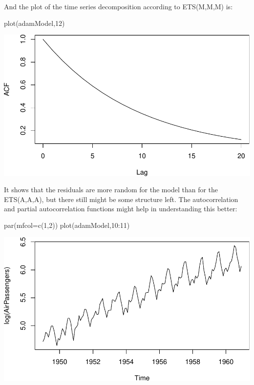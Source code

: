 \documentclass[
]{book}
\newenvironment{Shaded}{\begin{snugshade}}{\end{snugshade}}
\newcommand{\AttributeTok}[1]{\textcolor[rgb]{0.77,0.63,0.00}{#1}}
\newcommand{\DecValTok}[1]{\textcolor[rgb]{0.00,0.00,0.81}{#1}}
\newcommand{\FunctionTok}[1]{\textcolor[rgb]{0.00,0.00,0.00}{#1}}
\newcommand{\NormalTok}[1]{#1}
\newcommand{\SpecialCharTok}[1]{\textcolor[rgb]{0.00,0.00,0.00}{#1}}
\theoremstyle{definition}
\theoremstyle{definition}
\theoremstyle{definition}
\theoremstyle{definition}
\theoremstyle{remark}
\begin{document}
And the plot of the time series decomposition according to ETS(M,M,M) is:

\begin{Shaded}
\begin{Highlighting}[]
\FunctionTok{plot}\NormalTok{(adamModel,}\DecValTok{12}\NormalTok{)}
\end{Highlighting}
\end{Shaded}

\includegraphics{adam_files/figure-latex/unnamed-chunk-48-1.pdf}

It shows that the residuals are more random for the model than for the ETS(A,A,A), but there still might be some structure left. The autocorrelation and partial autocorrelation functions might help in understanding this better:

\begin{Shaded}
\begin{Highlighting}[]
\FunctionTok{par}\NormalTok{(}\AttributeTok{mfcol=}\FunctionTok{c}\NormalTok{(}\DecValTok{1}\NormalTok{,}\DecValTok{2}\NormalTok{))}
\FunctionTok{plot}\NormalTok{(adamModel,}\DecValTok{10}\SpecialCharTok{:}\DecValTok{11}\NormalTok{)}
\end{Highlighting}
\end{Shaded}

\includegraphics{adam_files/figure-latex/unnamed-chunk-49-1.pdf}
\end{document}
